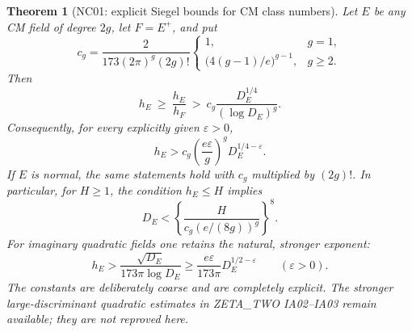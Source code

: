 \documentclass[11pt]{article}
\newtheorem{theorem}{Theorem}[section]
\theoremstyle{remark}
\begin{document}
\begin{theorem}[NC01: explicit Siegel bounds for CM class numbers]
\label{NC01}
Let $E$ be any CM field of degree $2g$, let $F=E^+$, and put
\[
 c_g=\frac{2}{173(2\pi)^g(2g)!}
       \begin{cases}
       1,&g=1,\\
       \bigl(4(g-1)/e\bigr)^{g-1},&g\geq2.
       \end{cases}
\]
Then
\begin{equation}\label{eq:NC01-log}
 h_E\ \geq\ \frac{h_E}{h_F}\ >\
 c_g\frac{D_E^{1/4}}{(\log D_E)^g}.
\end{equation}
Consequently, for every explicitly given $\varepsilon>0$,
\begin{equation}\label{eq:NC01-epsilon}
 h_E>c_g\left(\frac{e\varepsilon}{g}\right)^g
                 D_E^{1/4-\varepsilon}.
\end{equation}
If $E$ is normal, the same statements hold with $c_g$ multiplied by
$(2g)!$.  In particular, for $H\geq1$, the condition $h_E\leq H$ implies
\begin{equation}\label{eq:NC01-cutoff}
 D_E<\left\{\frac{H}{c_g(e/(8g))^g}\right\}^{8}.
\end{equation}
For imaginary quadratic fields one retains the natural, stronger exponent:
\begin{equation}\label{eq:NC01-quadratic}
 h_E>\frac{\sqrt{D_E}}{173\pi\log D_E}
 \geq\frac{e\varepsilon}{173\pi}D_E^{1/2-\varepsilon}
 \qquad(\varepsilon>0).
\end{equation}
The constants are deliberately coarse and are completely explicit.
The stronger large-discriminant quadratic estimates in
ZETA\_TWO IA02--IA03 remain available; they are not reproved here.
\end{theorem}
\end{document}
